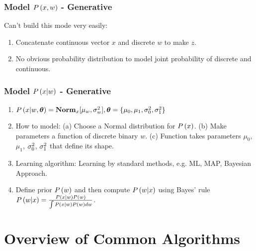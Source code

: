 \subsubsection*{Model $\P{x,w}$ - Generative}
Can't build this mode very easily:
	\begin{enumerate}
		\item Concatenate continuous vector $x$ and discrete $w$ to make $z$.
		\item No obvious probability distribution to model joint probability of discrete and continuous.
	\end{enumerate}

\subsubsection*{Model $\P{x|w}$ - Generative}
	\begin{enumerate}
		\item $\P{x|w,\vec{\th}}=\Norm_x[\mu_w,\si_w^2], \vec{\th}=\{\mu_0,\mu_1,\si_0^2,\si_1^2\}$
		\item How to model: (a) Choose a Normal distribution for $\P{x}$. (b) Make parameters a function of discrete binary $w$. (c) Function takes parameters $\mu_0$, $\mu_1$, $\si_0^2$, $\si_1^2$ that define its shape. 
		\item Learning algorithm: Learning by standard methods, e.g. ML, MAP, Bayesian Approach.
		\item Define prior $\P{w}$ and then compute $\P{w|x}$ using Bayes' rule $\P{w|x}=\frac{\P{x|w}\P{w}}{\int\P{x|w}\P{w}dw}$.
	\end{enumerate}

\section{Overview of Common Algorithms}
\label{section3.5}

